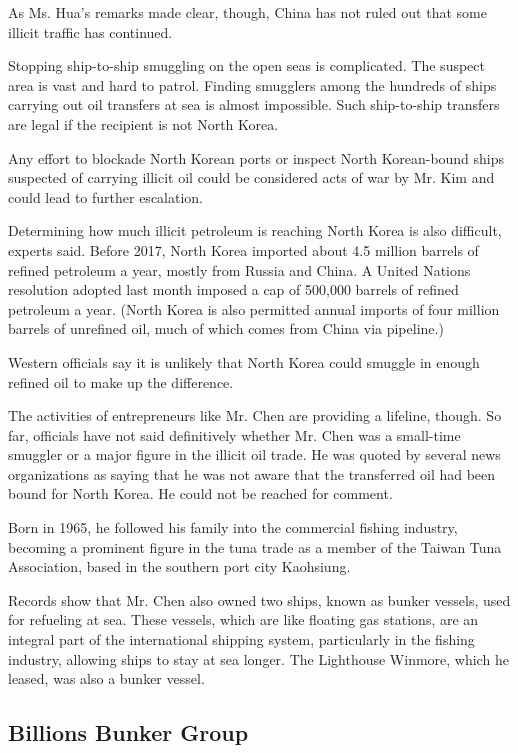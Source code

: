 As Ms. Hua's remarks made clear, though, China has not ruled out that
some illicit traffic has continued.

Stopping ship-to-ship smuggling on the open seas is complicated. The
suspect area is vast and hard to patrol. Finding smugglers among the
hundreds of ships carrying out oil transfers at sea is almost
impossible. Such ship-to-ship transfers are legal if the recipient is
not North Korea.

Any effort to blockade North Korean ports or inspect North Korean-bound
ships suspected of carrying illicit oil could be considered acts of war
by Mr. Kim and could lead to further escalation.

Determining how much illicit petroleum is reaching North Korea is also
difficult, experts said. Before 2017, North Korea imported about 4.5
million barrels of refined petroleum a year, mostly from Russia and
China. A United Nations resolution adopted last month imposed a cap of
500,000 barrels of refined petroleum a year. (North Korea is also
permitted annual imports of four million barrels of unrefined oil, much
of which comes from China via pipeline.)

Western officials say it is unlikely that North Korea could smuggle in
enough refined oil to make up the difference.

The activities of entrepreneurs like Mr. Chen are providing a lifeline,
though. So far, officials have not said definitively whether Mr. Chen
was a small-time smuggler or a major figure in the illicit oil trade. He
was quoted by several news organizations as saying that he was not aware
that the transferred oil had been bound for North Korea. He could not be
reached for comment.

Born in 1965, he followed his family into the commercial fishing
industry, becoming a prominent figure in the tuna trade as a member of
the Taiwan Tuna Association, based in the southern port city Kaohsiung.

Records show that Mr. Chen also owned two ships, known as bunker
vessels, used for refueling at sea. These vessels, which are like
floating gas stations, are an integral part of the international
shipping system, particularly in the fishing industry, allowing ships to
stay at sea longer. The Lighthouse Winmore, which he leased, was also a
bunker vessel.

\hypertarget{billions-bunker-group}{%
\subsection{Billions Bunker Group}\label{billions-bunker-group}}

